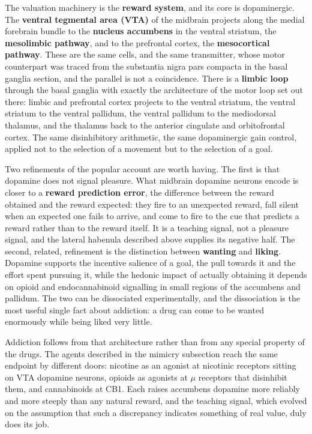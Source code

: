 \documentclass[11pt]{article}
\begin{document}
The valuation machinery is the \textbf{reward system}, and its core is dopaminergic. The \textbf{ventral tegmental area (VTA)} of the midbrain projects along the medial forebrain bundle to the \textbf{nucleus accumbens} in the ventral striatum, the \textbf{mesolimbic pathway}, and to the prefrontal cortex, the \textbf{mesocortical pathway}. These are the same cells, and the same transmitter, whose motor counterpart was traced from the substantia nigra pars compacta in the basal ganglia section, and the parallel is not a coincidence. There is a \textbf{limbic loop} through the basal ganglia with exactly the architecture of the motor loop set out there: limbic and prefrontal cortex projects to the ventral striatum, the ventral striatum to the ventral pallidum, the ventral pallidum to the mediodorsal thalamus, and the thalamus back to the anterior cingulate and orbitofrontal cortex. The same disinhibitory arithmetic, the same dopaminergic gain control, applied not to the selection of a movement but to the selection of a goal.

Two refinements of the popular account are worth having. The first is that dopamine does not signal pleasure. What midbrain dopamine neurons encode is closer to a \textbf{reward prediction error}, the difference between the reward obtained and the reward expected: they fire to an unexpected reward, fall silent when an expected one fails to arrive, and come to fire to the cue that predicts a reward rather than to the reward itself. It is a teaching signal, not a pleasure signal, and the lateral habenula described above supplies its negative half. The second, related, refinement is the distinction between \textbf{wanting} and \textbf{liking}. Dopamine supports the incentive salience of a goal, the pull towards it and the effort spent pursuing it, while the hedonic impact of actually obtaining it depends on opioid and endocannabinoid signalling in small regions of the accumbens and pallidum. The two can be dissociated experimentally, and the dissociation is the most useful single fact about addiction: a drug can come to be wanted enormously while being liked very little.

Addiction follows from that architecture rather than from any special property of the drugs. The agents described in the mimicry subsection reach the same endpoint by different doors: nicotine as an agonist at nicotinic receptors sitting on VTA dopamine neurons, opioids as agonists at $\mu$ receptors that disinhibit them, and cannabinoids at CB1. Each raises accumbens dopamine more reliably and more steeply than any natural reward, and the teaching signal, which evolved on the assumption that such a discrepancy indicates something of real value, duly does its job.
\end{document}
